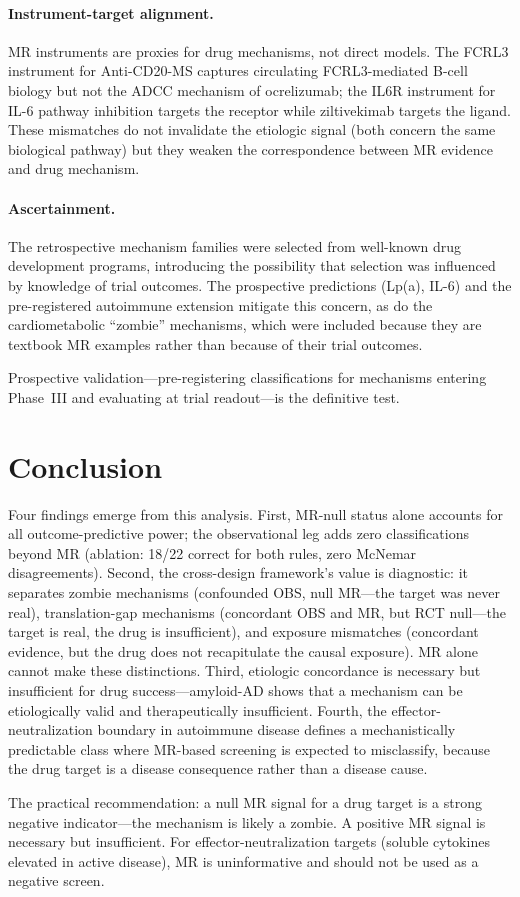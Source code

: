 \documentclass[11pt]{article}
\begin{document}
\paragraph{Instrument-target alignment.} MR instruments are proxies for drug mechanisms, not direct models. The FCRL3 instrument for Anti-CD20-MS captures circulating FCRL3-mediated B-cell biology but not the ADCC mechanism of ocrelizumab; the IL6R instrument for IL-6 pathway inhibition targets the receptor while ziltivekimab targets the ligand. These mismatches do not invalidate the etiologic signal (both concern the same biological pathway) but they weaken the correspondence between MR evidence and drug mechanism.

\paragraph{Ascertainment.} The retrospective mechanism families were selected from well-known drug development programs, introducing the possibility that selection was influenced by knowledge of trial outcomes. The prospective predictions (Lp(a), IL-6) and the pre-registered autoimmune extension mitigate this concern, as do the cardiometabolic ``zombie'' mechanisms, which were included because they are textbook MR examples rather than because of their trial outcomes.

Prospective validation---pre-registering classifications for mechanisms entering Phase~III and evaluating at trial readout---is the definitive test.

\section{Conclusion}

Four findings emerge from this analysis. First, MR-null status alone accounts for all outcome-predictive power; the observational leg adds zero classifications beyond MR (ablation: 18/22 correct for both rules, zero McNemar disagreements). Second, the cross-design framework's value is diagnostic: it separates zombie mechanisms (confounded OBS, null MR---the target was never real), translation-gap mechanisms (concordant OBS and MR, but RCT null---the target is real, the drug is insufficient), and exposure mismatches (concordant evidence, but the drug does not recapitulate the causal exposure). MR alone cannot make these distinctions. Third, etiologic concordance is necessary but insufficient for drug success---amyloid-AD shows that a mechanism can be etiologically valid and therapeutically insufficient. Fourth, the effector-neutralization boundary in autoimmune disease defines a mechanistically predictable class where MR-based screening is expected to misclassify, because the drug target is a disease consequence rather than a disease cause.

The practical recommendation: a null MR signal for a drug target is a strong negative indicator---the mechanism is likely a zombie. A positive MR signal is necessary but insufficient. For effector-neutralization targets (soluble cytokines elevated in active disease), MR is uninformative and should not be used as a negative screen.



\end{document}
